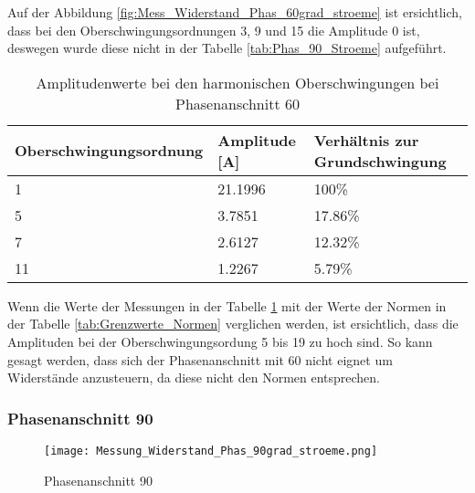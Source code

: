 Auf der Abbildung \ref{fig:Mess_Widerstand_Phas_60grad_stroeme} ist ersichtlich, dass bei den Oberschwingungsordnungen 3, 9 und 15 die Amplitude 0 ist, deswegen wurde diese nicht in der Tabelle \ref{tab:Phas_90_Stroeme} aufgeführt.

\begin{table}[ht!]
	\centering
	\begin{tabular}{|l|l|l|}
		\hline
		Oberschwingungsordnung & Amplitude [A] 	& Verhältnis zur Grundschwingung	\\ \hline
		1                      & 21.1996   		& 100\%								\\ \hline
		5                      & 3.7851    		& 17.86\%							\\ \hline
		7                      & 2.6127    		& 12.32\%							\\ \hline
		11                     & 1.2267    		& 5.79\%							\\ \hline
	\end{tabular}
	\caption{Amplitudenwerte bei den harmonischen Oberschwingungen bei Phasenanschnitt 60\textdegree}\label{tab:Phas_60_Stroeme}
\end{table}

Wenn die Werte der Messungen in der Tabelle \ref{tab:Phas_60_Stroeme} mit der Werte der Normen in der Tabelle \ref{tab:Grenzwerte_Normen} verglichen werden, ist ersichtlich, dass die Amplituden bei der Oberschwingungsordung 5 bis 19 zu hoch sind. So kann gesagt werden, dass sich der Phasenanschnitt mit 60\textdegree \hspace{0.02cm} nicht eignet um Widerstände anzusteuern, da diese nicht den Normen entsprechen. 


\subsubsection*{Phasenanschnitt 90\textdegree}
\begin{figure}[ht!]
	\centering
	\texttt{[image: Messung\_Widerstand\_Phas\_90grad\_stroeme.png]}	
	\caption{Phasenanschnitt 90\textdegree}\label{fig:Mess_Widerstand_Phas_90grad_stroeme}
\end{figure}

